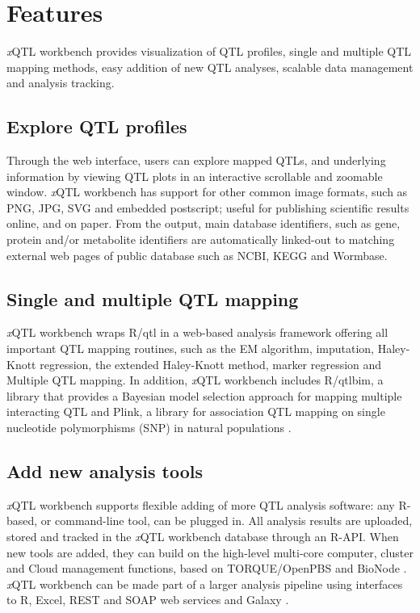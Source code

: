 \section{Features}
\textsl{x}QTL workbench provides visualization of QTL profiles, single and multiple QTL mapping methods, easy addition of new QTL analyses, scalable data management and analysis tracking.

\subsection{Explore QTL profiles}
Through the web interface, users can explore mapped QTLs, and underlying information by viewing QTL plots in an interactive scrollable and zoomable window. \textsl{x}QTL workbench has support for other common image formats, such as PNG, JPG, SVG and embedded postscript; useful for publishing scientific results online, and on paper. From the output, main database identifiers, such as gene, protein and/or metabolite identifiers are automatically linked-out to matching external web pages of public database such as NCBI, KEGG and Wormbase.

\subsection{Single and multiple QTL mapping}
\textsl{x}QTL workbench wraps R/qtl \cite{Arends_2010, Broman_2003} in a web-based analysis framework offering all important QTL mapping routines, such as the EM algorithm, imputation, Haley-Knott regression, the extended Haley-Knott method, marker regression and Multiple QTL mapping. In addition, \textsl{x}QTL workbench includes R/qtlbim, a library that provides a Bayesian model selection approach for mapping multiple interacting QTL \cite{Yandell_2007} and Plink, a library for association QTL mapping on single nucleotide polymorphisms (SNP) in natural populations \cite{Purcell_2007}.

\subsection{Add new analysis tools}
\textsl{x}QTL workbench supports flexible adding of more QTL analysis software: any R-based, or command-line tool, can be plugged in. All analysis results are uploaded, stored and tracked in the \textsl{x}QTL workbench database through an R-API. When new tools are added, they can build on the high-level multi-core computer, cluster and Cloud management functions, based on TORQUE/OpenPBS and BioNode \cite{Prins_2012}. \textsl{x}QTL workbench can be made part of a larger analysis pipeline using interfaces to R, Excel, REST and SOAP web services and Galaxy \cite{Goecks_2010}.


